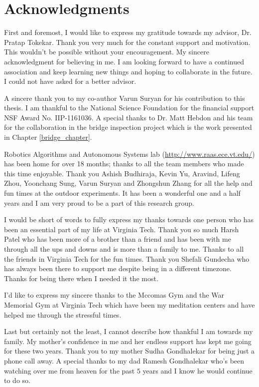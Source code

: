 \documentclass[12pt]{report}
\begin{document}
\chapter*{Acknowledgments}
First and foremost, I would like to express my gratitude towards my advisor, Dr. Pratap Tokekar. Thank you very much for the constant support and motivation. This wouldn't be possible without your encouragement. My sincere acknowledgment for believing in me. I am looking forward to have a continued association and keep learning new things and hoping to collaborate in the future. I could not have asked for a better advisor. \par 
A sincere thank you to my co-author Varun Suryan for his contribution to this thesis. I am thankful to the National Science Foundation for the financial support NSF Award No. IIP-1161036. A special thanks to Dr. Matt Hebdon and his team for the collaboration in the bridge inspection project which is the work presented in Chapter \ref{bridge_chapter}.\par
Robotics Algorithms and Autonomous Systems lab (\url{http://www.raas.ece.vt.edu/}) has been home for over 18 months; thanks to all the team members who made this time enjoyable. Thank you Ashish Budhiraja, Kevin Yu, Aravind, Lifeng Zhou, Yoonchang Sung, Varun Suryan and Zhongshun Zhang for all the help and fun times at the outdoor experiments. It has been a wonderful one and a half years and I am very proud to be a part of this research group. \par 
I would be short of words to fully express my thanks towards one person who has been an essential part of my life at Virginia Tech. Thank you so much Harsh Patel who has been more of a brother than a friend and has been with me through all the ups and downs and is more than a family to me. Thanks to all the friends in Virginia Tech for the fun times.  Thank you Shefali Gundecha who has always been there to support me despite being in a different timezone. Thanks for being there when I needed it the most.\par 
I'd like to express my sincere thanks to the Mccomas Gym and the War Memorial Gym at Virginia Tech which have been my meditation centers and have helped me through the stressful times.\par 
Last but certainly not the least, I cannot describe how thankful I am towards my family. My mother's confidence in me and her endless support has kept me going for these two years. Thank you to my mother Sudha Gondhalekar for being just a phone call away. A special thanks to my dad Ramesh Gondhalekar who's been watching over me from heaven for the past $5$ years and I know he would continue to do so. 
\end{document}
